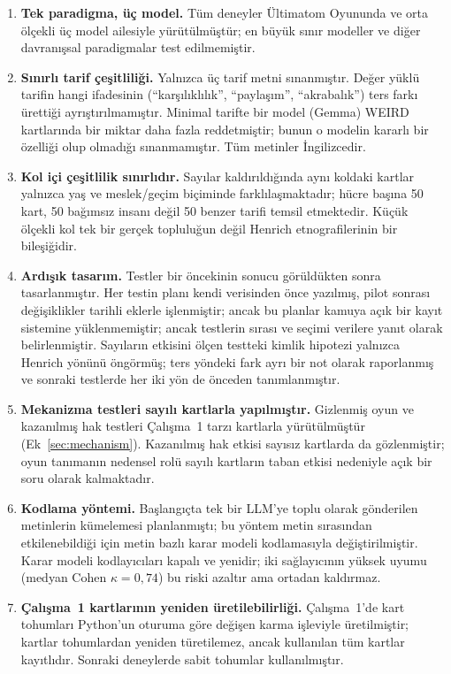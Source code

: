\documentclass[11pt]{article}
\begin{document}
\begin{enumerate}
\item \textbf{Tek paradigma, üç model.} Tüm deneyler Ültimatom Oyununda ve orta ölçekli üç model ailesiyle yürütülmüştür; en büyük sınır modeller ve diğer davranışsal paradigmalar test edilmemiştir.
\item \textbf{Sınırlı tarif çeşitliliği.} Yalnızca üç tarif metni sınanmıştır. Değer yüklü tarifin hangi ifadesinin (``karşılıklılık'', ``paylaşım'', ``akrabalık'') ters farkı ürettiği ayrıştırılmamıştır. Minimal tarifte bir model (Gemma) WEIRD kartlarında bir miktar daha fazla reddetmiştir; bunun o modelin kararlı bir özelliği olup olmadığı sınanmamıştır. Tüm metinler İngilizcedir.
\item \textbf{Kol içi çeşitlilik sınırlıdır.} Sayılar kaldırıldığında aynı koldaki kartlar yalnızca yaş ve meslek/geçim biçiminde farklılaşmaktadır; hücre başına 50 kart, 50 bağımsız insanı değil 50 benzer tarifi temsil etmektedir. Küçük ölçekli kol tek bir gerçek topluluğun değil Henrich etnografilerinin bir bileşiğidir.
\item \textbf{Ardışık tasarım.} Testler bir öncekinin sonucu görüldükten sonra tasarlanmıştır. Her testin planı kendi verisinden önce yazılmış, pilot sonrası değişiklikler tarihli eklerle işlenmiştir; ancak bu planlar kamuya açık bir kayıt sistemine yüklenmemiştir; ancak testlerin sırası ve seçimi verilere yanıt olarak belirlenmiştir. Sayıların etkisini ölçen testteki kimlik hipotezi yalnızca Henrich yönünü öngörmüş; ters yöndeki fark ayrı bir not olarak raporlanmış ve sonraki testlerde her iki yön de önceden tanımlanmıştır.
\item \textbf{Mekanizma testleri sayılı kartlarla yapılmıştır.} Gizlenmiş oyun ve kazanılmış hak testleri Çalışma~1 tarzı kartlarla yürütülmüştür (Ek~\ref{sec:mechanism}). Kazanılmış hak etkisi sayısız kartlarda da gözlenmiştir; oyun tanımanın nedensel rolü sayılı kartların taban etkisi nedeniyle açık bir soru olarak kalmaktadır.
\item \textbf{Kodlama yöntemi.} Başlangıçta tek bir LLM'ye toplu olarak gönderilen metinlerin kümelemesi planlanmıştı; bu yöntem metin sırasından etkilenebildiği için metin bazlı karar modeli kodlamasıyla değiştirilmiştir. Karar modeli kodlayıcıları kapalı ve yenidir; iki sağlayıcının yüksek uyumu (medyan Cohen $\kappa = 0{,}74$) bu riski azaltır ama ortadan kaldırmaz.
\item \textbf{Çalışma~1 kartlarının yeniden üretilebilirliği.} Çalışma~1'de kart tohumları Python'un oturuma göre değişen karma işleviyle üretilmiştir; kartlar tohumlardan yeniden türetilemez, ancak kullanılan tüm kartlar kayıtlıdır. Sonraki deneylerde sabit tohumlar kullanılmıştır.
\end{enumerate}
\end{document}
